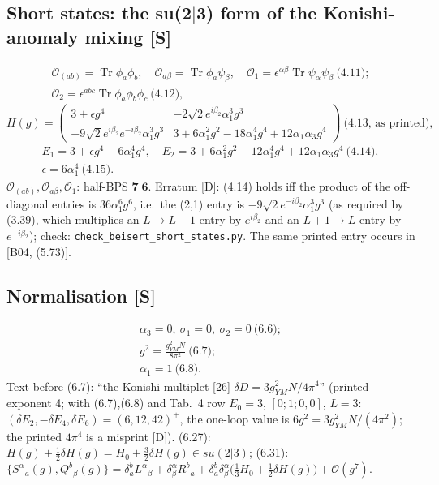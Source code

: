 \documentclass[10pt]{article}
\begin{document}
\subsection{Short states: the su(2$|$3) form of the Konishi-anomaly mixing [S]}
\begin{gather*}
\mathcal O_{(ab)}=\operatorname{Tr}\phi_a\phi_b,\quad \mathcal O_{a\beta}=\operatorname{Tr}\phi_a\psi_\beta,\quad \mathcal O_1=\epsilon^{\alpha\beta}\operatorname{Tr}\psi_\alpha\psi_\beta\ \text{(4.11)};\\ \mathcal O_2=\epsilon^{abc}\operatorname{Tr}\phi_a\phi_b\phi_c\ \text{(4.12)},
\end{gather*}
\begin{equation*}
H(g)=\begin{pmatrix}3+\epsilon g^4 & -2\sqrt2e^{i\beta_2}\alpha_1^3g^3\\ -9\sqrt2e^{i\beta_2}e^{-i\beta_2}\alpha_1^3g^3 & 3+6\alpha_1^2g^2-18\alpha_1^4g^4+12\alpha_1\alpha_3g^4\end{pmatrix}\ \text{(4.13, as printed)},
\end{equation*}
\begin{gather*}
E_1=3+\epsilon g^4-6\alpha_1^4g^4,\quad E_2=3+6\alpha_1^2g^2-12\alpha_1^4g^4+12\alpha_1\alpha_3g^4\ \text{(4.14)},\\ \epsilon=6\alpha_1^4\ \text{(4.15)}.
\end{gather*}
$\mathcal O_{(ab)},\mathcal O_{a\beta},\mathcal O_1$: half-BPS $\mathbf 7|\mathbf 6$. Erratum [D]: (4.14) holds iff the product of the off-diagonal entries is $36\alpha_1^6g^6$, i.e.\ the (2,1) entry is $-9\sqrt2e^{-i\beta_2}\alpha_1^3g^3$ (as required by (3.39), which multiplies an $L\to L+1$ entry by $e^{i\beta_2}$ and an $L+1\to L$ entry by $e^{-i\beta_2}$); check: \texttt{check\_beisert\_\allowbreak short\_states.py}. The same printed entry occurs in [B04, (5.73)].

\subsection{Normalisation [S]}
\begin{gather*}
\alpha_3=0,\ \sigma_1=0,\ \sigma_2=0\ \text{(6.6)};\\ g^2=\frac{g_{YM}^2N}{8\pi^2}\ \text{(6.7)};\\ \alpha_1=1\ \text{(6.8)}.
\end{gather*}
Text before (6.7): ``the Konishi multiplet [26] $\delta D=3g_{YM}^2N/4\pi^4$'' (printed exponent 4; with (6.7),(6.8) and Tab.\ 4 row $E_0=3$, $[0;1;0,0]$, $L=3$: $(\delta E_2,-\delta E_4,\delta E_6)=(6,12,42)^+$, the one-loop value is $6g^2=3g_{YM}^2N/(4\pi^2)$; the printed $4\pi^4$ is a misprint [D]).
(6.27): $H(g)+\tfrac12\delta H(g)=H_0+\tfrac32\delta H(g)\in su(2|3)$; (6.31): $\{S^\alpha{}_a(g),Q^b{}_\beta(g)\}=\delta^b_aL^\alpha{}_\beta+\delta^\alpha_\beta R^b{}_a+\delta^b_a\delta^\alpha_\beta\big(\tfrac13H_0+\tfrac12\delta H(g)\big)+\mathcal O(g^7)$.
\end{document}
